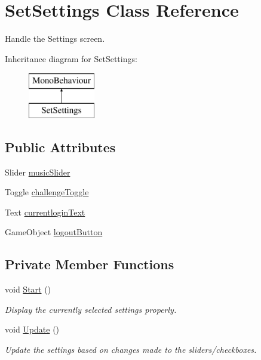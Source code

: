 \hypertarget{class_set_settings}{}\section{Set\+Settings Class Reference}
\label{class_set_settings}


Handle the Settings screen.  


Inheritance diagram for Set\+Settings\+:\begin{figure}[H]
\begin{center}
\leavevmode
\includegraphics[height=2.000000cm]{class_set_settings}
\end{center}
\end{figure}
\subsection*{Public Attributes}
\begin{DoxyCompactItemize}
\item 
Slider \mbox{\hyperlink{class_set_settings_a641871cf47ac0056a4ee213ed3d787b4}{music\+Slider}}
\item 
Toggle \mbox{\hyperlink{class_set_settings_aa1d76df5c31261919a7132d81471a7b0}{challenge\+Toggle}}
\item 
Text \mbox{\hyperlink{class_set_settings_a8cb995fa0671cc73dbe7ada21f371e5a}{currentlogin\+Text}}
\item 
Game\+Object \mbox{\hyperlink{class_set_settings_adeb813cf570d93ebae34e126df46ff68}{logout\+Button}}
\end{DoxyCompactItemize}
\subsection*{Private Member Functions}
\begin{DoxyCompactItemize}
\item 
void \mbox{\hyperlink{class_set_settings_a7d405e56dc6123768fac6fdd6e70ab0f}{Start}} ()
\begin{DoxyCompactList}\small\item\em Display the currently selected settings properly. \end{DoxyCompactList}\item 
void \mbox{\hyperlink{class_set_settings_a73e6df43190f0b5494a4b66328fa9d12}{Update}} ()
\begin{DoxyCompactList}\small\item\em Update the settings based on changes made to the sliders/checkboxes. \end{DoxyCompactList}\end{DoxyCompactItemize}
